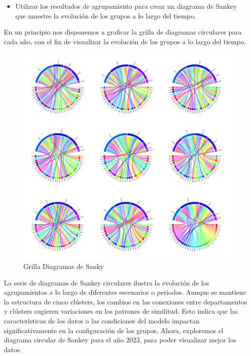 \documentclass[12pt]{article}
\begin{document}
\begin{itemize}
    \item Utilizar los resultados de agrupamiento para crear un diagrama de Sankey que muestre la evolución de los grupos a lo largo del tiempo.
\end{itemize}

En un principio nos disponemos a graficar la grilla de diagramas circulares para cada año, con el fin de visualizar la evolución de los grupos a lo largo del tiempo.



\begin{figure}[H]
    \centering
    \includegraphics[width=1\linewidth]{Imagenes/GrillaSankey.png}
    \caption{Grilla Diagramas de Sanky}
    \label{fig_enter_label}
\end{figure}

\newpage

La serie de diagramas de Sankey circulares ilustra la evolución de los agrupamientos a lo largo de diferentes escenarios o periodos. Aunque se mantiene la estructura de cinco clústers, los cambios en las conexiones entre departamentos y clústers sugieren variaciones en los patrones de similitud. Esto indica que las características de los datos o las condiciones del modelo impactan significativamente en la configuración de los grupos. Ahora, exploremos el diagrama circular de Sankey para el año 2023, para poder visualizar mejor los datos. 
\end{document}
